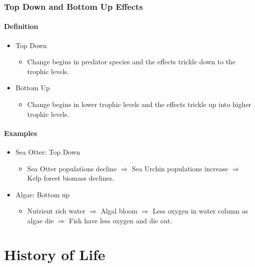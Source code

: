 \documentclass[12pt]{article}
\begin{document}
\subsubsection{Top Down and Bottom Up Effects}

\paragraph{Definition}
\begin{itemize}
    \item Top Down
          \begin{itemize}
              \item Change begins in predator species and the effects trickle down to the trophic levels.
          \end{itemize}
    \item Bottom Up
          \begin{itemize}
              \item Change begins in lower trophic levels and the effects trickle up into higher trophic levels.
          \end{itemize}
\end{itemize}

\paragraph{Examples}
\begin{itemize}
    \item Sea Otter: Top Down
          \begin{itemize}
              \item Sea Otter populations decline $\Rightarrow$ Sea Urchin populations increase $\Rightarrow$ Kelp forest biomass declines.
          \end{itemize}
    \item Algae: Bottom up
          \begin{itemize}
              \item Nutrient rich water $\Rightarrow$ Algal bloom $\Rightarrow$ Less oxygen in water column as algae die $\Rightarrow$ Fish have less oxygen and die out.
          \end{itemize}
\end{itemize}


\section{History of Life}
\end{document}
